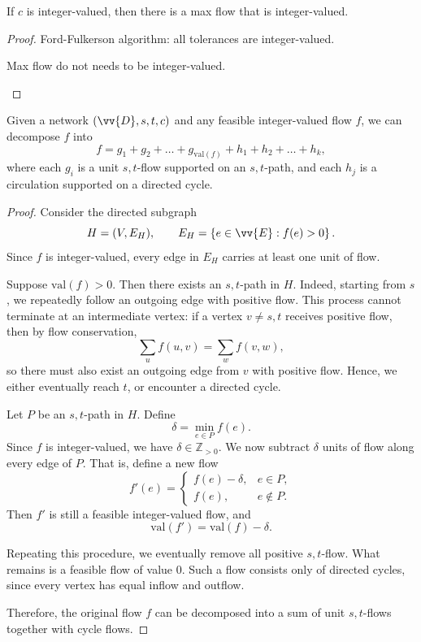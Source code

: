 \begin{theorem}
    If \(c\) is integer-valued, then there is a max flow that is integer-valued. 
\end{theorem}
\begin{proof}
    Ford-Fulkerson algorithm: all tolerances are integer-valued. 
    \begin{remark}
        Max flow do not needs to be integer-valued.
    \end{remark}
\end{proof}

\begin{theorem}
    Given a network $(\vv{D}, s, t, c)$ and any feasible integer-valued flow $f$, we can decompose $f$ into
    \[
        f = g_1 + g_2 + \dots + g_{\mathrm{val}(f)} + h_1 + h_2 + \dots + h_k,
    \]
    where each $g_i$ is a unit $s, t$-flow supported on an $s, t$-path, and each $h_j$ is a circulation supported on a directed cycle.
\end{theorem}

\begin{proof}
    Consider the directed subgraph
    \[
        H = (V, E_H), \qquad E_H = \left\{ e \in \vv{E} : f(e) > 0 \right\}.
    \]
    Since $f$ is integer-valued, every edge in $E_H$ carries at least one unit of flow.

    Suppose $\mathrm{val}(f) > 0$.
    Then there exists an $s, t$-path in $H$.
    Indeed, starting from $s$, we repeatedly follow an outgoing edge with positive flow.
    This process cannot terminate at an intermediate vertex:
    if a vertex $v \neq s, t$ receives positive flow, then by flow conservation,
    \[
        \sum_{u} f(u, v)
        =
        \sum_{w} f(v, w),
    \]
    so there must also exist an outgoing edge from $v$ with positive flow.
    Hence, we either eventually reach $t$, or encounter a directed cycle.

    Let $P$ be an $s, t$-path in $H$.
    Define
    \[
        \delta = \min_{e \in P} f(e).
    \]
    Since $f$ is integer-valued, we have $\delta \in \mathbb{Z}_{>0}$.
    We now subtract $\delta$ units of flow along every edge of $P$.
    That is, define a new flow
    \[
        f'(e)
        =
        \begin{cases}
            f(e) - \delta, & e \in P, \\
            f(e), & e \notin P.
        \end{cases}
    \]
    Then $f'$ is still a feasible integer-valued flow, and
    \[
        \mathrm{val}(f')
        =
        \mathrm{val}(f) - \delta.
    \]

    Repeating this procedure, we eventually remove all positive $s, t$-flow.
    What remains is a feasible flow of value $0$.
    Such a flow consists only of directed cycles, since every vertex has equal inflow and outflow.

    Therefore, the original flow $f$ can be decomposed into a sum of unit $s, t$-flows together with cycle flows.
\end{proof}

